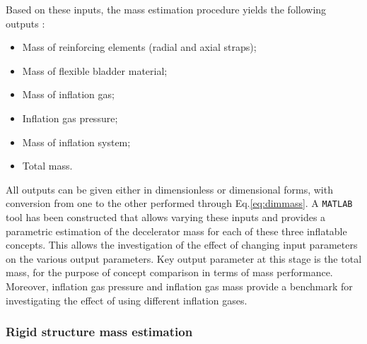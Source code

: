 Based on these inputs, the mass estimation procedure yields the following outputs \cite{Samareh2011}:
\begin{itemize}
\item Mass of reinforcing elements (radial and axial straps);
\item Mass of flexible bladder material;
\item Mass of inflation gas;
\item Inflation gas pressure;
\item Mass of inflation system;
\item Total mass.
\end{itemize}
All outputs can be given either in dimensionless or dimensional forms, with conversion from one to the other performed through Eq.\ref{eq:dimmass}. A \texttt{MATLAB} tool has been constructed that allows varying these inputs and provides a parametric estimation of the decelerator mass for each of these three inflatable concepts. This allows the investigation of the effect of changing input parameters on the various output parameters. Key output parameter at this stage is the total mass, for the purpose of concept comparison in terms of mass performance. Moreover, inflation gas pressure and inflation gas mass provide a benchmark for investigating the effect of using different inflation gases.




\subsubsection{Rigid structure mass estimation}
